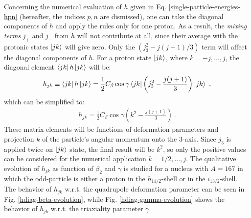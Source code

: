 Concerning the numerical evaluation of $h$ given in Eq. \eqref{single-particle-energies-hpn} (hereafter, the indices $p,n$ are dismissed), one can take the diagonal components of $h$ and apply the rules only for one proton. As a result, the \emph{mixing terms} $j_+$ and $j_-$ from $h$ will not contribute at all, since their average with the protonic states $\ket{jk}$ will give zero. Only the $(j_3^2-j(j+1)/3)$ term will affect the diagonal components of $h$. For a proton state $\ket{jk}$, where $k=-j,\dots,j$, the diagonal element $\bra{jk}h\ket{jk}$ will be:
\begin{align}
    h_{jk}\equiv\bra{jk}h\ket{jk}=\frac{1}{2}C_\beta\cos\gamma\bra{jk}\left(j_3^2-\frac{j(j+1)}{3}\right)\ket{jk}\ ,
    \label{hdiag-equation-general}
\end{align}
which can be simplified to:
\begin{align}
    h_{jk}=\frac{1}{2}C_\beta\cos\gamma\left(k^2-\frac{j(j+1)}{3}\right)\ .
    \label{hdiag-equation}
\end{align}
These matrix elements will be functions of deformation parameters and projection $k$ of the particle's angular momentum onto the $3$-axis. Since $j_3$ is applied twice on $\ket{jk}$ state, the final result will be $k^2$, so only the positive values can be considered for the numerical application $k=1/2,\dots,j$. The qualitative evolution of $h_{jk}$ as function of $\beta_2$ and $\gamma$ is studied for a nucleus with $A=167$ in which the odd-particle is either a proton in the $h_{11/2}$-shell or in the $i_{13/2}$-shell. The behavior of $h_{jk}$ w.r.t. the quadrupole deformation parameter can be seen in Fig. \ref{hdiag-beta-evolution}, while Fig. \ref{hdiag-gamma-evolution} shows the behavior of $h_{jk}$ w.r.t. the triaxiality parameter $\gamma$.
